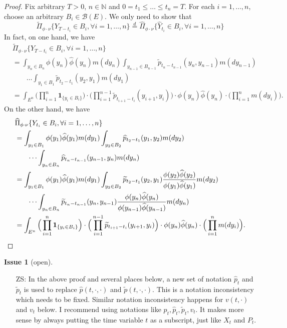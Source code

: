 \documentclass[12pt,a4paper]{amsart}
\numberwithin{equation}{section}
\theoremstyle{plain}
\theoremstyle{definition}
\newtheorem{iss}{Issue}
\begin{document}
\begin{proof}
	Fix arbitrary $T>0$, $n \in \mathbb N$ and $0= t_1\leq \dots \leq t_n = T$.
	For each $i=1,\dots, n$, choose an arbitrary $B_i \in \mathscr B(E)$.
	We only need to show that
  \[
    \widetilde \Pi_{\phi \cdot \nu}\{Y_{T-t_i}\in B_i,\forall i=1,\dots, n\}
    \overset{d}{=}\widehat \Pi_{\phi \cdot \nu}\{\widehat Y_{t_i}\in B_i,\forall i=1,\dots, n\}
  \]
	In fact, on one hand, we have
  \begin{align}
    &\widetilde \Pi_{\phi \cdot \nu}\{Y_{T-t_i}\in B_i,\forall i=1,\dots, n\}
    \\&= \int_{y_n\in B_n} \phi(y_n)\widehat\phi(y_n) m(dy_n)\int_{y_{n-1}\in B_{n-1}} \widetilde p_{t_n - t_{n-1}}(y_n,y_{n-1})m(dy_{n-1})
    \\& \qquad \dots \int_{y_1\in B_1} \widetilde p_{t_2 - t_1}(y_2,y_1)m(dy_1)
    \\&= \int_{E^n} \Big(\prod_{i=1}^n \mathbf 1_{\{y_i\in B_i\}}\Big)\cdot\Big(\prod_{i=1}^{n-1} \widetilde p_{t_{i+1}-t_i}(y_{i+1},y_i)\Big)\cdot\phi(y_n)\widehat\phi(y_n)\cdot \Big(\prod_{i=1}^nm(dy_i)\Big).
  \end{align}
	On the other hand, we have
  \begin{align}
    &\widehat \Pi_{\phi\cdot\nu}\{Y_{t_i}\in B_i, \forall i = 1,\dots, n\}
    \\&= \int_{y_1\in B_1} \phi(y_1)\widehat \phi(y_1)m(dy_1) \int_{y_2\in B_2} \widehat p_{t_2-t_1}(y_1,y_2)m(dy_2)
    \\&\qquad \dots\int_{y_n\in B_n}\widehat p_{t_n-t_{n-1}}(y_{n-1},y_n)m(dy_n)
    \\&= \int_{y_1\in  B_1} \phi(y_1)\widehat \phi(y_1)m(dy_1) \int_{y_2\in B_2} \widetilde p_{t_2-t_1}(y_2,y_1)\frac{\phi(y_2)\widehat \phi(y_2)}{\phi(y_1)\widehat \phi(y_1)}m(dy_2)
    \\&\qquad \dots\int_{y_n\in B_n}\widetilde p_{t_n-t_{n-1}}(y_n,y_{n-1})\frac{\phi(y_n)\widehat\phi(y_n)}{\phi(y_{n-1})\widehat\phi(y_{n-1})}m(dy_n)
    \\&= \int_{E^n} \Big(\prod_{i=1}^n \mathbf 1_{\{y_i\in B_i\}}\Big)\cdot\Big(\prod_{i=1}^{n-1} \widetilde p_{t_{i+1}-t_i}(y_{i+1},y_i)\Big)\cdot\phi(y_n)\widehat\phi(y_n)\cdot \Big(\prod_{i=1}^n m(dy_i)\Big).
    \qedhere
  \end{align}
\end{proof}
\begin{iss}[open]~
\label{iss:notation_for_pt}
  \begin{itemize}
  \item[ZS:]
    In the above proof and several places below, a new set of notation $\widehat p_t$ and $\widetilde p_t$ is used to replace $\widehat p(t,\cdot,\cdot)$ and $\widetilde p(t,\cdot, \cdot)$. This is a notation inconsistency which needs to be fixed. Similar notation inconsistency happens for $v(t,\cdot)$ and $v_t$ below. I recommend using notations like $p_t, \widehat p_t,\widetilde p_t, v_t$. It makes more sense by always putting the time variable $t$ as a subscript, just like $X_t$ and $P_t$.
  \end{itemize}
\end{iss}
\end{document}
